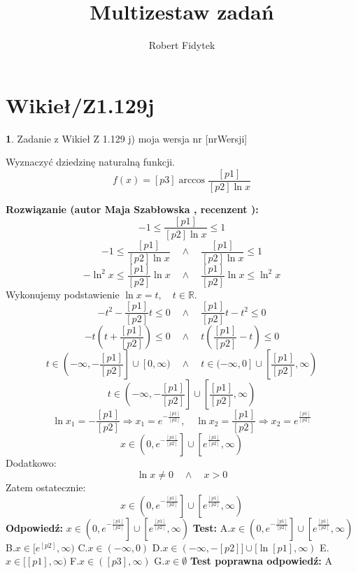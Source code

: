 \documentclass[12pt, a4paper]{article}
\title{Multizestaw zadań}
\author{Robert Fidytek}
\date{}
\theoremstyle{definition} %
\newtheorem{zad}{}
\newcommand{\kategoria}[1]{\section{#1}} %
\newcommand{\zadStart}[1]{\begin{zad}#1\newline} %
\newcommand{\zadStop}{\end{zad}}   %
\newcommand{\rozwStart}[2]{\noindent \textbf{Rozwiązanie (autor #1 , recenzent #2): }\newline} %
\newcommand{\rozwStop}{\newline}                                            %
\newcommand{\odpStart}{\noindent \textbf{Odpowiedź:}\newline}    %
\newcommand{\odpStop}{\newline}                                             %
\newcommand{\testStart}{\noindent \textbf{Test:}\newline} %
\newcommand{\testStop}{\newline} %
\newcommand{\kluczStart}{\noindent \textbf{Test poprawna odpowiedź:}\newline} %
\newcommand{\kluczStop}{\newline} %
\begin{document}
\maketitle


\kategoria{Wikieł/Z1.129j}
\zadStart{Zadanie z Wikieł Z 1.129 j) moja wersja nr [nrWersji]}

Wyznaczyć dziedzinę naturalną funkcji.
$$f(x)=[p3]\arccos \frac{[p1]}{[p2]\ln x}$$
\zadStop

\rozwStart{Maja Szabłowska}{}
$$-1\leq \frac{[p1]}{[p2]\ln x} \leq 1 $$
$$-1\leq \frac{[p1]}{[p2]\ln x} \quad \land \quad \frac{[p1]}{[p2]\ln x} \leq 1$$
$$-\ln^{2}x\leq \frac{[p1]}{[p2]}\ln x \quad \land \quad \frac{[p1]}{[p2]}\ln x \leq \ln^{2}x$$
Wykonujemy podstawienie $\ln x=t, \quad t\in\mathbb{R}.$
$$-t^{2}-\frac{[p1]}{[p2]}t\leq 0 \quad \land \quad \frac{[p1]}{[p2]}t-t^{2}\leq 0$$
$$-t\left(t+\frac{[p1]}{[p2]}\right)\leq 0 \quad \land \quad t\left(\frac{[p1]}{[p2]}-t \right)\leq 0$$
$$t\in\left(-\infty, -\frac{[p1]}{[p2]}\right]\cup[0,\infty) \quad \land \quad t\in(-\infty,0]\cup\left[\frac{[p1]}{[p2]},\infty\right)$$
$$t\in\left(-\infty,-\frac{[p1]}{[p2]}\right]\cup\left[\frac{[p1]}{[p2]},\infty\right)$$
$$\ln x_{1}=-\frac{[p1]}{[p2]} \Rightarrow x_{1}=e^{-\frac{[p1]}{[p2]}}, \quad \ln x_{2}=\frac{[p1]}{[p2]} \Rightarrow x_{2}=e^{\frac{[p1]}{[p2]}}$$
$$x\in\left(0,e^{-\frac{[p1]}{[p2]}}\right]\cup\left[e^{\frac{[p1]}{[p2]}},\infty\right)$$
Dodatkowo:
$$\ln x \neq 0 \quad \land \quad x>0$$
Zatem ostatecznie:
$$x\in\left(0,e^{-\frac{[p1]}{[p2]}}\right]\cup\left[e^{\frac{[p1]}{[p2]}},\infty\right)$$
\rozwStop
\odpStart
$x\in\left(0,e^{-\frac{[p1]}{[p2]}}\right]\cup\left[e^{\frac{[p1]}{[p2]}},\infty\right)$
\odpStop
\testStart
A.$x\in\left(0,e^{-\frac{[p1]}{[p2]}}\right]\cup\left[e^{\frac{[p1]}{[p2]}},\infty\right)$
B.$x\in[e^{[p2]},\infty)$
C.$x\in(-\infty, 0)$
D.$x\in(-\infty, -[p2]] \cup [\ln[p1],\infty)$
E.$x\in[[p1],\infty)$
F.$x\in([p3],\infty)$
G.$x\in\emptyset$
\testStop
\kluczStart
A
\kluczStop
\end{document}
